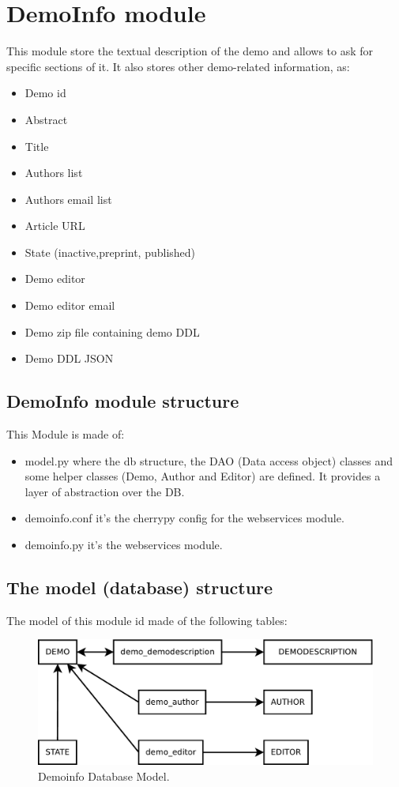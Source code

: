 \section{DemoInfo module}
This module store the textual description of the demo and allows to ask for specific sections of it. It also stores other demo-related information, as:
\begin{itemize}
\item Demo id
\item Abstract
\item Title 
\item Authors list
\item Authors email list
\item Article URL
\item State (inactive,preprint, published)
\item Demo editor
\item Demo editor email
\item Demo zip file containing demo DDL 
\item Demo DDL JSON
\end{itemize}

\subsection{DemoInfo module structure}
This Module is made of:
\begin{itemize}
  \item model.py where the db structure, the DAO (Data access object) classes and some helper classes (Demo, Author and Editor) are defined. It provides a layer of abstraction over the DB.
  \item demoinfo.conf it's the cherrypy config for the webservices module.
  \item demoinfo.py it's the webservices module.
\end{itemize}

\subsection{The model (database) structure}
The model of this module id made of the following tables:

\begin{figure}[!ht]
\centering
\includegraphics[width=0.8\linewidth]{demo_info/images/demoinfo_model.pdf}
\caption{Demoinfo Database Model. } 
\label{fig:demoinfo_model}
\end{figure}

